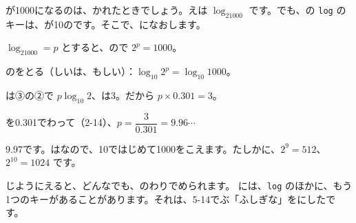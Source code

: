 \leavevmode\label{bk:3-12:soko}が1000になるのは、かれたときでしょう。えは $\log_21000$ です。でも、の \texttt{log} のキーは、が10のです。そこで、になおします。
\begin{enumerate}[label={\bkcircled[bkTheme]{\arabic*}}, leftmargin=2.4\zw, itemsep=1pt, topsep=2pt]
\item $\log_21000=p$ とすると、ので $2^p=1000$。
\item {}のをとる（しいは、もしい）：$\log_{10}2^p=\log_{10}1000$。
\item {}は③の②で $p\log_{10}2$、は3。だから $p\times0.301=3$。
\item {}を0.301でわって（2-14）、$p=\dfrac{3}{0.301}=9.96\cdots$
\end{enumerate}
9.97です。はなので、10ではじめて1000をこえます。たしかに、$2^9=512$、$2^{10}=1024$ です。

じようにえると、どんなでも、のわりでめられます。
には、\texttt{log} のほかに、もう1つのキーがあることがあります。それは、5-14でぶ「ふしぎな」をにしたです。


